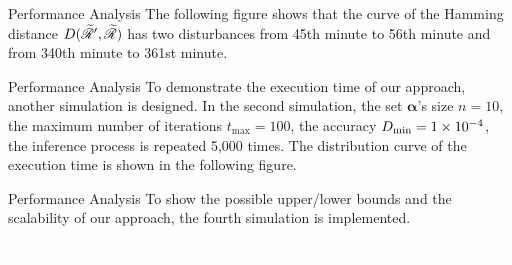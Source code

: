 \begin{frame}{Performance Analysis}
    The following figure shows that the curve of the Hamming distance $D(\widetilde{\mathscr{R}}{}', \widetilde{\mathscr{R}}{})$ has two disturbances from 45th minute to 56th minute and from 340th minute to 361st minute.    

    
\end{frame}

\begin{frame}{Performance Analysis}
    To demonstrate the execution time of our approach, another simulation is designed. In the second simulation, the set $\bm{\alpha}$'s size $n = 10$, the maximum number of iterations $t_{\max} = 100$, the accuracy $D_{\min} = 1\times 10^{-4}$, the inference process is repeated 5,000 times. The distribution curve of the execution time is shown in the following figure.

    
\end{frame}

\begin{frame}{Performance Analysis}
    To show the possible upper/lower bounds and the scalability of our approach, the fourth simulation is implemented.  

    
\end{frame}

\begin{frame}{}
    \label{Section: Questions}
    \centering
    \vfill\vspace{1em}\textcolor{white}{\scshape Thanks to Li Xuan \& Chu Zhongtao. }\vfill
\end{frame}

